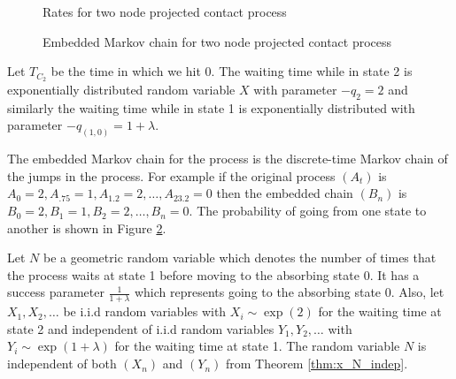 \documentclass{article}
\theoremstyle{plain}
\theoremstyle{definition}
\theoremstyle{remark}
\numberwithin{equation}{section}
\begin{document}
\begin{figure}[H]
    \centering
    \caption{Rates for two node projected contact process}
    \label{fig:rates_mc_two_contact}
\end{figure}

\begin{figure}[H]
    \centering
    \caption{Embedded Markov chain for two node projected contact process}
    \label{fig:discrete_mc_two_contact}
\end{figure}

Let $T_{C_2}$ be the time in which we hit 0.
The waiting time while in state 2 is exponentially distributed random variable $X$ with parameter $- q_{2} = 2$ and similarly the waiting time while in state 1 is exponentially distributed with parameter $- q_{(1,0)} = 1 + \lambda$.

The embedded Markov chain for the process is the discrete-time Markov chain of the jumps in the process.
For example if the original process $(A_t)$ is $A_{0} = 2, A_{.75} = 1, A_{1.2} = 2, \ldots, A_{23.2} = 0$ then the embedded chain $(B_n)$ is $B_{0} = 2, B_1 = 1, B_2 = 2, \ldots, B_n = 0$.
The probability of going from one state to another is shown in Figure \ref{fig:discrete_mc_two_contact}.

Let $N$ be a geometric random variable which denotes the number of times that the process waits at state 1 before moving to the absorbing state 0.
It has a success parameter $\frac{1}{1 + \lambda}$ which represents going to the absorbing state 0.
Also, let $X_1, X_2, \ldots$ be i.i.d random variables with
$X_i \sim \exp(2)$ for the waiting time at state 2 and independent of i.i.d random variables $Y_1, Y_2, \ldots$ with  $Y_i \sim \exp(1 + \lambda)$ for the waiting time at state 1.
The random variable $N$ is independent of both $(X_n)$ and $(Y_n)$ from Theorem \ref{thm:x_N_indep}.
\end{document}
